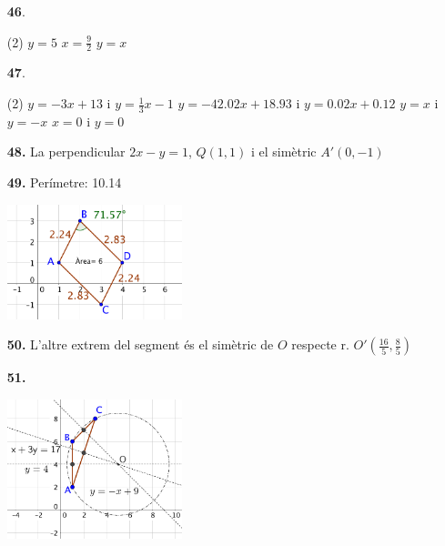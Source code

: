 \documentclass[a4paper, pdf, twoside]{book}
\begin{document}
\begin{multicols}{2}
\begin{enumerate}

 \item[\fontfamily{phv}\selectfont\color{blue}\textbf{46}. ] 
 \begin{tasks}[column-sep=1em, item-indent=1.3333em](2)
	 \task $y=5$
	 \task $x=\frac {9}{2}$
	 \task $y=x$ 
\end{tasks}
\vspace{0.25cm}



 \item[\fontfamily{phv}\selectfont\color{blue}\textbf{47}. ] 
 \begin{tasks}[column-sep=1em, item-indent=1.3333em](2)
	 \task* $y=-3x+13$ i $y=\frac {1}{3}x-1$
	 \task* $y=-42.02x+18.93$ i $y=0.02x+0.12$
	 \task $y=x$ i $y=-x$
	 \task $x=0$ i $y=0$
\end{tasks}
\vspace{0.25cm}
\item[\fontfamily{phv}\selectfont\color{blue}\textbf{48. }] 
La perpendicular $2x-y=1$, $Q(1,1)$ i el simètric $A'(0,-1)$
\vspace{0.25cm}
\item[\fontfamily{phv}\selectfont\color{blue}\textbf{49. }] 
Perímetre: 10.14\par \includegraphics [width=0.4\textwidth ]{img-sol/t9-45}
\vspace{0.25cm}
\item[\fontfamily{phv}\selectfont\color{blue}\textbf{50. }] 
L'altre extrem del segment és el simètric de $O$ respecte r. $O'(\frac {16}{5}, \frac {8}{5})$
\vspace{0.25cm}
\item[\fontfamily{phv}\selectfont\color{blue}\textbf{51. }] 
\mbox {}\par \includegraphics [width=0.4\textwidth ]{img-sol/t9-47}

\end{enumerate}
\end{multicols}
\end{document}
